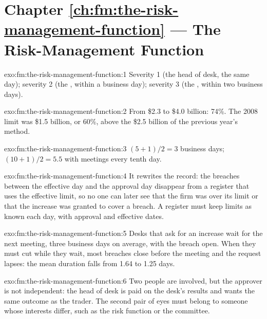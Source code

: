 \section*{Chapter \ref{ch:fm:the-risk-management-function} --- The Risk-Management Function}

\begin{solution}{exo:fm:the-risk-management-function:1}
Severity 1 (the head of desk, the same day); severity 2 (the , within a business day); severity 3 (the , within
two business days).
\end{solution}

\begin{solution}{exo:fm:the-risk-management-function:2}
From \$2.3 to \$4.0 billion: 74\%. The 2008 limit was \$1.5 billion, or 60\%, above the \$2.5 billion of the previous year's method.
\end{solution}

\begin{solution}{exo:fm:the-risk-management-function:3}
$(5+1)/2=3$ business days; $(10+1)/2=5.5$ with meetings every tenth day.
\end{solution}

\begin{solution}{exo:fm:the-risk-management-function:4}
It rewrites the record: the breaches between the effective day and the approval day disappear from a register that uses the effective limit, so
no one can later see that the firm was over its limit or that the increase was granted to cover a breach. A register must keep limits as known
each day, with approval and effective dates.
\end{solution}

\begin{solution}{exo:fm:the-risk-management-function:5}
Desks that ask for an increase wait for the next meeting, three business days on average, with the breach open. When they must cut while they
wait, most breaches close before the meeting and the request lapses: the mean duration falls from 1.64 to 1.25 days.
\end{solution}

\begin{solution}{exo:fm:the-risk-management-function:6}
Two people are involved, but the approver is not independent: the head of desk is paid on the desk's results and wants the same outcome as the
trader. The second pair of eyes must belong to someone whose interests differ, such as the risk function or the committee.
\end{solution}

